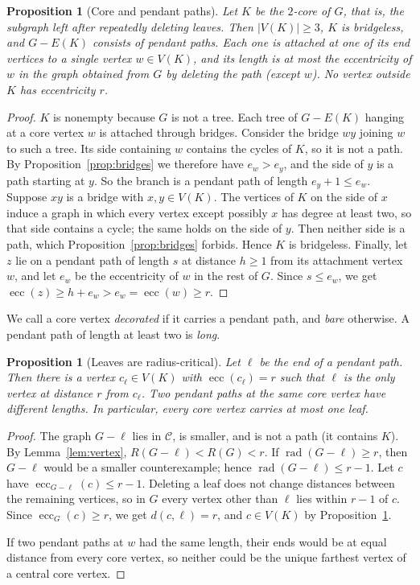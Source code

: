 \documentclass[11pt,a4paper]{article}
\newtheorem{proposition}[theorem]{Proposition}
\theoremstyle{definition}
\newcommand{\rad}{\operatorname{rad}}
\newcommand{\ecc}{\operatorname{ecc}}
\newcommand{\C}{\mathcal{C}}
\begin{document}
\begin{proposition}[Core and pendant paths]\label{prop:core}
Let $K$ be the $2$-core of $G$, that is, the subgraph left after repeatedly deleting leaves. Then $|V(K)|\ge3$, $K$ is bridgeless, and $G-E(K)$ consists of pendant paths. Each one is attached at one of its end vertices to a single vertex $w\in V(K)$, and its length is at most the eccentricity of $w$ in the graph obtained from $G$ by deleting the path (except $w$). No vertex outside $K$ has eccentricity $r$.
\end{proposition}
\begin{proof}
$K$ is nonempty because $G$ is not a tree. Each tree of $G-E(K)$ hanging at a core vertex $w$ is attached through bridges. Consider the bridge $wy$ joining $w$ to such a tree. Its side containing $w$ contains the cycles of $K$, so it is not a path. By Proposition~\ref{prop:bridges} we therefore have $e_w>e_y$, and the side of $y$ is a path starting at $y$. So the branch is a pendant path of length $e_y+1\le e_w$. Suppose $xy$ is a bridge with $x,y\in V(K)$. The vertices of $K$ on the side of $x$ induce a graph in which every vertex except possibly $x$ has degree at least two, so that side contains a cycle; the same holds on the side of $y$. Then neither side is a path, which Proposition~\ref{prop:bridges} forbids. Hence $K$ is bridgeless. Finally, let $z$ lie on a pendant path of length $s$ at distance $h\ge1$ from its attachment vertex $w$, and let $e_w$ be the eccentricity of $w$ in the rest of $G$. Since $s\le e_w$, we get $\ecc(z)\ge h+e_w>e_w=\ecc(w)\ge r$.
\end{proof}

We call a core vertex \emph{decorated} if it carries a pendant path, and \emph{bare} otherwise. A pendant path of length at least two is \emph{long}.

\begin{proposition}[Leaves are radius-critical]\label{prop:leaves}
Let $\ell$ be the end of a pendant path. Then there is a vertex $c_\ell\in V(K)$ with $\ecc(c_\ell)=r$ such that $\ell$ is the only vertex at distance $r$ from $c_\ell$. Two pendant paths at the same core vertex have different lengths. In particular, every core vertex carries at most one leaf.
\end{proposition}
\begin{proof}
The graph $G-\ell$ lies in $\C$, is smaller, and is not a path (it contains $K$). By Lemma~\ref{lem:vertex}, $R(G-\ell)<R(G)<r$. If $\rad(G-\ell)\ge r$, then $G-\ell$ would be a smaller counterexample; hence $\rad(G-\ell)\le r-1$. Let $c$ have $\ecc_{G-\ell}(c)\le r-1$. Deleting a leaf does not change distances between the remaining vertices, so in $G$ every vertex other than $\ell$ lies within $r-1$ of $c$. Since $\ecc_G(c)\ge r$, we get $d(c,\ell)=r$, and $c\in V(K)$ by Proposition~\ref{prop:core}.

If two pendant paths at $w$ had the same length, their ends would be at equal distance from every core vertex, so neither could be the unique farthest vertex of a central core vertex.
\end{proof}
\end{document}
